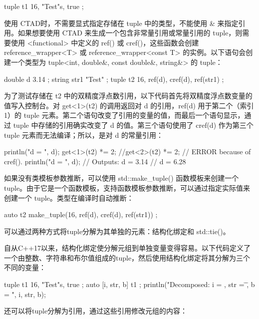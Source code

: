 \begin{cpp}
tuple t1 { 16, "Test"s, true };
\end{cpp}

使用 CTAD时，不需要显式指定存储在 tuple 中的类型，不能使用 \& 来指定引用。如果想要使用 CTAD 来生成一个包含非常量引用或常量引用的 tuple，则需要使用 <functional> 中定义的 ref() 或 cref()，这些函数会创建 reference\_wrapper<T> 或 reference\_wrapper<const T> 的实例。以下语句会创建一个类型为 tuple<int, double\&, const double\&, string\&> 的 tuple：

\begin{cpp}
double d { 3.14 };
string str1 { "Test" };
tuple t2 { 16, ref(d), cref(d), ref(str1) };
\end{cpp}

为了测试存储在 t2 中的双精度浮点数引用，以下代码首先将双精度浮点数变量的值写入控制台。对 get<1>(t2) 的调用返回对 d 的引用，ref(d) 用于第二个（索引 1）的 tuple 元素。第二个语句改变了引用的变量的值，而最后一个语句显示，通过 tuple 中存储的引用确实改变了 d 的值。第三个语句使用了 cref(d) 作为第三个 tuple 元素而无法编译；所以，是对 d 的常量引用：

\begin{cpp}
println("d = {}", d);
get<1>(t2) *= 2;
//get<2>(t2) *= 2; // ERROR because of cref().
println("d = {}", d);
// Outputs: d = 3.14
// d = 6.28
\end{cpp}

如果没有类模板参数推断，可以使用 std::make\_tuple() 函数模板来创建一个 tuple。由于它是一个函数模板，支持函数模板参数推断，可以通过指定实际值来创建一个 tuple。类型在编译时自动推断：

\begin{cpp}
auto t2 { make_tuple(16, ref(d), cref(d), ref(str1)) };
\end{cpp}


可以通过两种方式将tuple分解为其单独的元素：结构化绑定和 std::tie()。


自从C++17以来，结构化绑定使分解元组到单独变量变得容易。以下代码定义了一个由整数、字符串和布尔值组成的tuple，然后使用结构化绑定将其分解为三个不同的变量：

\begin{cpp}
tuple t1 { 16, "Test"s, true };
auto [i, str, b] { t1 };
println("Decomposed: i = {}, str = \"{}\", b = {}", i, str, b);
\end{cpp}

还可以将tuple分解为引用，通过这些引用修改元组的内容：

